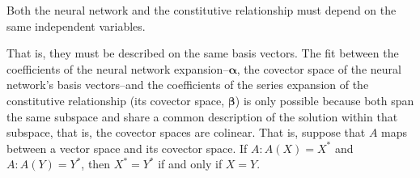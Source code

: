 \begin{condition}
    Both the neural network and the constitutive relationship must depend on the same independent variables.
\end{condition}
That is, they must be described on the same basis vectors. The fit between the coefficients of the neural network expansion--$\boldsymbol{\alpha}$, the covector space of the neural network's basis vectors--and the coefficients of the series expansion of the constitutive relationship (its covector space, $\boldsymbol{\beta}$) is only possible because both span the same subspace and share a common description of the solution within that subspace, that is, the covector spaces are colinear. That is, suppose that $A$ maps between a vector space and its covector space. If $A: A(X) = X^*$ and $A: A(Y) = Y^*$, then $X^* = Y^*$ if and only if $X = Y$.

